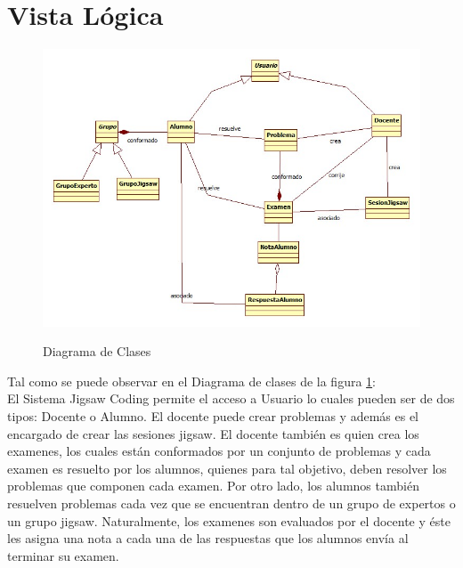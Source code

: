 \section{Vista Lógica}
\begin{figure}[!h]
	\centering
	\includegraphics[scale=0.6]{figuras/sad/diagrama_de_clases.jpg}\\
	\caption{Diagrama de Clases}\label{fig:diagrama_de_clases}
\end{figure}
Tal como se puede observar en el Diagrama de clases de la figura \ref{fig:diagrama_de_clases}:\\

El Sistema Jigsaw Coding permite el acceso a Usuario lo cuales pueden ser de dos tipos: Docente o Alumno. El docente puede crear problemas y además es el encargado de crear las sesiones jigsaw. El docente también es quien crea los examenes, los cuales están conformados por un conjunto de problemas y cada examen es resuelto por los alumnos, quienes para tal objetivo, deben resolver los problemas que componen cada examen. Por otro lado, los alumnos también resuelven problemas cada vez que se encuentran dentro de un grupo de expertos o un grupo jigsaw. Naturalmente, los examenes son evaluados por el docente y éste les asigna una nota a cada una de las respuestas que los alumnos envía al terminar su examen.
\clearpage
